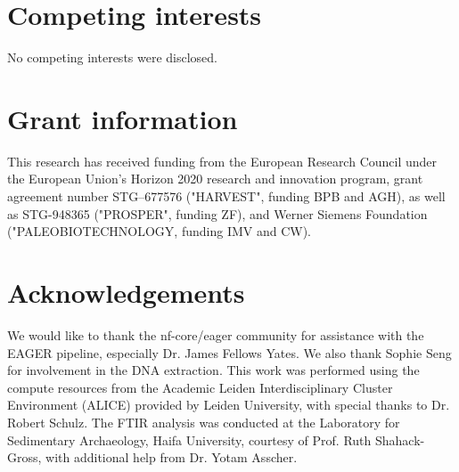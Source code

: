 \documentclass[10pt,a4paper]{article}
\begin{document}
\section*{Competing interests}

No competing interests were disclosed.

\section*{Grant information}

This research has received funding from the European Research Council under the
European Union’s Horizon 2020 research and innovation program, grant agreement
number STG–677576 ("HARVEST", funding BPB and AGH), as well as STG-948365 ("PROSPER", funding ZF),
and Werner Siemens Foundation ("PALEOBIOTECHNOLOGY, funding IMV and CW).

\section*{Acknowledgements}

We would like to thank the nf-core/eager community for assistance with the
EAGER pipeline, especially Dr. James Fellows Yates. We also thank Sophie Seng
for involvement in the DNA extraction. This work was performed using the compute
resources from the Academic Leiden Interdisciplinary Cluster Environment (ALICE)
provided by Leiden University, with special thanks to Dr. Robert Schulz.
The FTIR analysis was conducted at the Laboratory for Sedimentary Archaeology,
Haifa University, courtesy of Prof. Ruth Shahack-Gross, with additional help from
Dr. Yotam Asscher.

{\small
}




\end{document}
